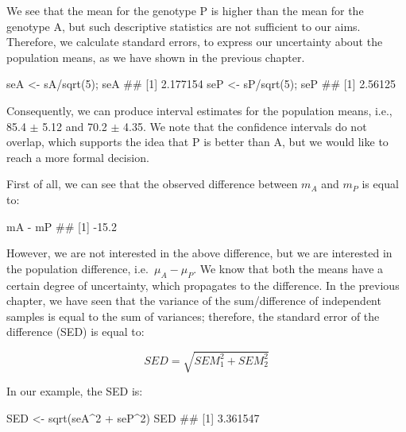 \documentclass[a4paper,12pt,oneside]{book}
\newenvironment{Shaded}{\begin{snugshade}}{\end{snugshade}}
\newcommand{\DecValTok}[1]{#1}
\newcommand{\SpecialCharTok}[1]{#1}
\newcommand{\DocumentationTok}[1]{#1}
\newcommand{\OtherTok}[1]{#1}
\newcommand{\FunctionTok}[1]{#1}
\newcommand{\NormalTok}[1]{#1}
\begin{document}
We see that the mean for the genotype P is higher than the mean for the genotype A, but such descriptive statistics are not sufficient to our aims. Therefore, we calculate standard errors, to express our uncertainty about the population means, as we have shown in the previous chapter.

\begin{Shaded}
\begin{Highlighting}[]
\NormalTok{seA }\OtherTok{\textless{}{-}}\NormalTok{ sA}\SpecialCharTok{/}\FunctionTok{sqrt}\NormalTok{(}\DecValTok{5}\NormalTok{); seA}
\DocumentationTok{\#\# [1] 2.177154}
\NormalTok{seP }\OtherTok{\textless{}{-}}\NormalTok{ sP}\SpecialCharTok{/}\FunctionTok{sqrt}\NormalTok{(}\DecValTok{5}\NormalTok{); seP}
\DocumentationTok{\#\# [1] 2.56125}
\end{Highlighting}
\end{Shaded}

Consequently, we can produce interval estimates for the population means, i.e., 85.4 \(\pm\) 5.12 and 70.2 \(\pm\) 4.35. We note that the confidence intervals do not overlap, which supports the idea that P is better than A, but we would like to reach a more formal decision.

First of all, we can see that the observed difference between \(m_A\) and \(m_P\) is equal to:

\begin{Shaded}
\begin{Highlighting}[]
\NormalTok{mA }\SpecialCharTok{{-}}\NormalTok{ mP}
\DocumentationTok{\#\# [1] {-}15.2}
\end{Highlighting}
\end{Shaded}

However, we are not interested in the above difference, but we are interested in the population difference, i.e.~\(\mu_A - \mu_P\). We know that both the means have a certain degree of uncertainty, which propagates to the difference. In the previous chapter, we have seen that the variance of the sum/difference of independent samples is equal to the sum of variances; therefore, the standard error of the difference (SED) is equal to:

\[SED = \sqrt{ SEM_1^2 + SEM_2^2 }\]

In our example, the SED is:

\begin{Shaded}
\begin{Highlighting}[]
\NormalTok{SED }\OtherTok{\textless{}{-}} \FunctionTok{sqrt}\NormalTok{(seA}\SpecialCharTok{\^{}}\DecValTok{2} \SpecialCharTok{+}\NormalTok{ seP}\SpecialCharTok{\^{}}\DecValTok{2}\NormalTok{)}
\NormalTok{SED}
\DocumentationTok{\#\# [1] 3.361547}
\end{Highlighting}
\end{Shaded}
\end{document}
